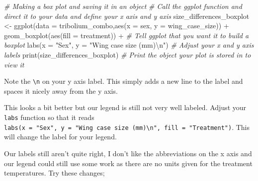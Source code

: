 \documentclass[
]{book}
\newenvironment{Shaded}{\begin{snugshade}}{\end{snugshade}}
\newcommand{\AttributeTok}[1]{\textcolor[rgb]{0.77,0.63,0.00}{#1}}
\newcommand{\CommentTok}[1]{\textcolor[rgb]{0.56,0.35,0.01}{\textit{#1}}}
\newcommand{\FunctionTok}[1]{\textcolor[rgb]{0.00,0.00,0.00}{#1}}
\newcommand{\NormalTok}[1]{#1}
\newcommand{\OtherTok}[1]{\textcolor[rgb]{0.56,0.35,0.01}{#1}}
\newcommand{\SpecialCharTok}[1]{\textcolor[rgb]{0.00,0.00,0.00}{#1}}
\newcommand{\StringTok}[1]{\textcolor[rgb]{0.31,0.60,0.02}{#1}}
\begin{document}
\begin{Shaded}
\begin{Highlighting}[]
\CommentTok{\# Making a box plot and saving it in an object}
\CommentTok{\# Call the ggplot function and direct it to your data and define your x axis and y axis}
\NormalTok{size\_differences\_boxplot }\OtherTok{\textless{}{-}} \FunctionTok{ggplot}\NormalTok{(}\AttributeTok{data =}\NormalTok{ tribolium\_combo,}\FunctionTok{aes}\NormalTok{(}\AttributeTok{x =}\NormalTok{ sex, }\AttributeTok{y =}\NormalTok{ wing\_case\_size)) }\SpecialCharTok{+} 
  \FunctionTok{geom\_boxplot}\NormalTok{(}\FunctionTok{aes}\NormalTok{(}\AttributeTok{fill =}\NormalTok{ treatment)) }\SpecialCharTok{+} \CommentTok{\# Tell ggplot that you want it to build a boxplot}
  \FunctionTok{labs}\NormalTok{(}\AttributeTok{x =} \StringTok{"Sex"}\NormalTok{, }\AttributeTok{y =} \StringTok{"Wing case size (mm)}\SpecialCharTok{\textbackslash{}n}\StringTok{"}\NormalTok{) }\CommentTok{\# Adjust your x and y axis labels }
\FunctionTok{print}\NormalTok{(size\_differences\_boxplot) }\CommentTok{\# Print the object your plot is stored in to view it}
\end{Highlighting}
\end{Shaded}

Note the \texttt{\textbackslash{}n} on your y axis label. This simply adds a new line to the label and spaces it nicely away from the y axis.

This looks a bit better but our legend is still not very well labeled. Adjust your \texttt{labs} function so that it reads \texttt{labs(x\ =\ "Sex",\ y\ =\ "Wing\ case\ size\ (mm)\textbackslash{}n",\ fill\ =\ "Treatment")}. This will change the label for your legend.

Our labels still aren't quite right, I don't like the abbreviations on the x axis and our legend could still use some work as there are no units given for the treatment temperatures. Try these changes;
\end{document}

